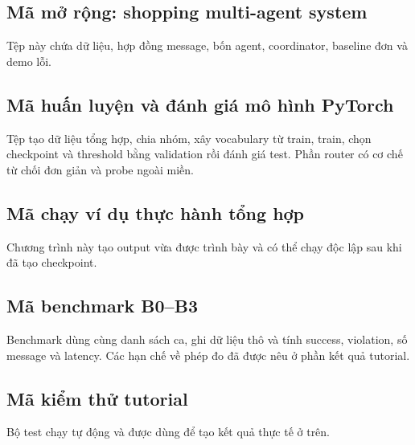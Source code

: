 \subsection{Mã mở rộng: shopping multi-agent system}
Tệp này chứa dữ liệu, hợp đồng message, bốn agent, coordinator, baseline đơn và demo lỗi.


\subsection{Mã huấn luyện và đánh giá mô hình PyTorch}
Tệp tạo dữ liệu tổng hợp, chia nhóm, xây vocabulary từ train, train, chọn checkpoint và threshold bằng validation rồi đánh giá test. Phần router có cơ chế từ chối đơn giản và probe ngoài miền.


\subsection{Mã chạy ví dụ thực hành tổng hợp}
Chương trình này tạo output vừa được trình bày và có thể chạy độc lập sau khi đã tạo checkpoint.


\subsection{Mã benchmark B0--B3}
Benchmark dùng cùng danh sách ca, ghi dữ liệu thô và tính success, violation, số message và latency. Các hạn chế về phép đo đã được nêu ở phần kết quả tutorial.


\subsection{Mã kiểm thử tutorial}
Bộ test chạy tự động và được dùng để tạo kết quả thực tế ở trên.

